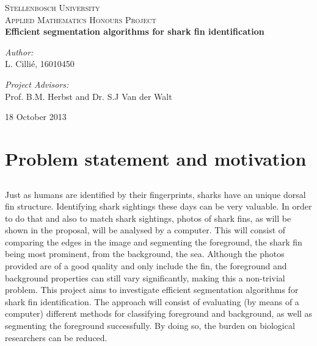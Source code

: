 \documentclass[a4paper,10pt]{article}
\begin{document}
\begin{titlepage}
\begin{center}
\textsc{\LARGE Stellenbosch University}\\[1.5cm]

\textsc{\Large Applied Mathematics Honours Project}\\[0.5cm]

{ \huge \bfseries Efficient segmentation algorithms for shark fin
identification \\[0.4cm] }

\begin{minipage}{0.4\textwidth}
\begin{center} \large
\emph{Author:}\\
L. Cilli\'{e}, 16010450
\end{center}
\end{minipage}
\begin{minipage}{0.4\textwidth}
\begin{center} \large
\emph{Project Advisors:} \\
Prof. B.M. Herbst and Dr. S.J Van der Walt
\end{center}
\end{minipage}

\vfill

\vspace{20mm}

18 October 2013
\end{center}

\end{titlepage}

\newpage
\tableofcontents

\newpage
\section{Problem statement and motivation}
\subsection{}
Just as humans are identified by their fingerprints, sharks have an unique
dorsal fin structure.  Identifying shark sightings these days can be very
valuable.  In order to do that and also to match shark sightings, photos of
shark fins, as will be shown in the proposal, will be analysed by a computer. 
This will consist of comparing the edges in the image and segmenting the
foreground, the shark fin being most prominent,  from the background, the sea. 
Although the photos provided are of a good quality and only include the fin, the
foreground and background properties can still vary significantly, making this a
non-trivial problem.  This project aims to investigate efficient segmentation
algorithms for shark fin identification.  The approach will consist of
evaluating (by means of a computer) different methods for classifying foreground
and background, as well as segmenting the foreground successfully.  By doing so,
the burden on biological researchers can be reduced.  \\
\end{document}
